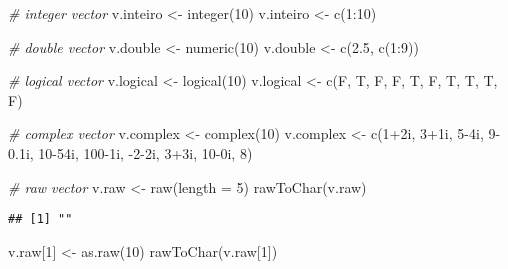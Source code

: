 \documentclass[
]{article}
\newenvironment{Shaded}{\begin{snugshade}}{\end{snugshade}}
\newcommand{\AttributeTok}[1]{\textcolor[rgb]{0.77,0.63,0.00}{#1}}
\newcommand{\CommentTok}[1]{\textcolor[rgb]{0.56,0.35,0.01}{\textit{#1}}}
\newcommand{\DecValTok}[1]{\textcolor[rgb]{0.00,0.00,0.81}{#1}}
\newcommand{\FloatTok}[1]{\textcolor[rgb]{0.00,0.00,0.81}{#1}}
\newcommand{\FunctionTok}[1]{\textcolor[rgb]{0.00,0.00,0.00}{#1}}
\newcommand{\NormalTok}[1]{#1}
\newcommand{\OtherTok}[1]{\textcolor[rgb]{0.56,0.35,0.01}{#1}}
\newcommand{\SpecialCharTok}[1]{\textcolor[rgb]{0.00,0.00,0.00}{#1}}
\begin{document}
\begin{Shaded}
\begin{Highlighting}[]
\CommentTok{\# integer vector}
\NormalTok{v.inteiro }\OtherTok{\textless{}{-}} \FunctionTok{integer}\NormalTok{(}\DecValTok{10}\NormalTok{)}
\NormalTok{v.inteiro }\OtherTok{\textless{}{-}} \FunctionTok{c}\NormalTok{(}\DecValTok{1}\SpecialCharTok{:}\DecValTok{10}\NormalTok{)}

\CommentTok{\# double vector}
\NormalTok{v.double }\OtherTok{\textless{}{-}} \FunctionTok{numeric}\NormalTok{(}\DecValTok{10}\NormalTok{)}
\NormalTok{v.double }\OtherTok{\textless{}{-}} \FunctionTok{c}\NormalTok{(}\FloatTok{2.5}\NormalTok{, }\FunctionTok{c}\NormalTok{(}\DecValTok{1}\SpecialCharTok{:}\DecValTok{9}\NormalTok{))}

\CommentTok{\# logical vector}
\NormalTok{v.logical }\OtherTok{\textless{}{-}} \FunctionTok{logical}\NormalTok{(}\DecValTok{10}\NormalTok{)}
\NormalTok{v.logical }\OtherTok{\textless{}{-}} \FunctionTok{c}\NormalTok{(F, T, F, F, T, F, T, T, T, F)}

\CommentTok{\# complex vector}
\NormalTok{v.complex }\OtherTok{\textless{}{-}} \FunctionTok{complex}\NormalTok{(}\DecValTok{10}\NormalTok{)}
\NormalTok{v.complex }\OtherTok{\textless{}{-}} \FunctionTok{c}\NormalTok{(}\DecValTok{1}\SpecialCharTok{+}\NormalTok{2i, }\DecValTok{3}\SpecialCharTok{+}\NormalTok{1i, }\DecValTok{5}\SpecialCharTok{{-}}\NormalTok{4i, }\DecValTok{9}\FloatTok{{-}0.1}\NormalTok{i, }\DecValTok{10}\SpecialCharTok{{-}}\NormalTok{54i,}
               \DecValTok{100}\SpecialCharTok{{-}}\NormalTok{1i, }\SpecialCharTok{{-}}\DecValTok{2}\SpecialCharTok{{-}}\NormalTok{2i, }\DecValTok{3}\SpecialCharTok{+}\NormalTok{3i, }\DecValTok{10}\SpecialCharTok{{-}}\NormalTok{0i, }\DecValTok{8}\NormalTok{)}

\CommentTok{\# raw vector}
\NormalTok{v.raw }\OtherTok{\textless{}{-}} \FunctionTok{raw}\NormalTok{(}\AttributeTok{length =} \DecValTok{5}\NormalTok{) }
\FunctionTok{rawToChar}\NormalTok{(v.raw)}
\end{Highlighting}
\end{Shaded}

\begin{verbatim}
## [1] ""
\end{verbatim}

\begin{Shaded}
\begin{Highlighting}[]
\NormalTok{v.raw[}\DecValTok{1}\NormalTok{] }\OtherTok{\textless{}{-}} \FunctionTok{as.raw}\NormalTok{(}\DecValTok{10}\NormalTok{)}
\FunctionTok{rawToChar}\NormalTok{(v.raw[}\DecValTok{1}\NormalTok{])}
\end{Highlighting}
\end{Shaded}
\end{document}

